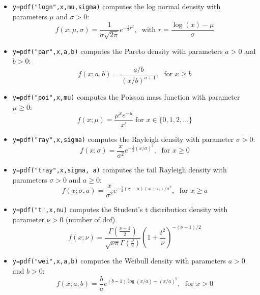 \begin{mandescription}
\begin{itemize}
\item {} \verb!y=pdf("logn",x,mu,sigma)! computes
  the log normal density with parameters $\mu$ and $\sigma > 0$:
$$
     f(x; \mu, \sigma) = \frac{ 1 }{ \sigma \sqrt{2\pi}}
     e^{-\frac{1}{2} r^2 }, \; \mbox{ with } r = \frac{\log(x)-\mu}{\sigma}
$$


\item {} \verb!y=pdf("par",x,a,b)! computes the Pareto
  density with parameters $a > 0$ and $b > 0$:
$$
     f(x; a, b) = \frac{ a/b }{ (x/b)^{a+1} }, \; \mbox{ for } x \ge b
$$


\item {} \verb!y=pdf("poi",x,mu)! computes
  the Poisson mass function with parameter $\mu \ge 0$:
$$
     f(x; \mu) = \frac{\mu^x e^{-\mu}}{x!} \;\mbox{for } x \in \{0, 1, 2, \dots\}
$$

\item {} \verb!y=pdf("ray",x,sigma)! computes the Rayleigh
  density with parameter $\sigma > 0$:
$$
     f(x; \sigma) = \frac{x}{\sigma^2} e^{-\frac{1}{2} (x/\sigma)^2 }, \; \mbox{ for } x \ge 0
$$

\item {} \verb!y=pdf("tray",x,sigma, a)! computes
  the tail Rayleigh density with parameters $\sigma > 0$ and $a \ge 0$:
$$
     f(x; \sigma, a) = \frac{x}{\sigma^2} e^{-\frac{1}{2} (x-a)(x+a)/\sigma^2 }, \; \mbox{ for } x \ge a
$$


\item {} \verb!y=pdf("t",x,nu)! computes
  the Student's t distribution density with parameter $\nu > 0$
  (number of dof).
$$
    f(x; \nu) = \frac{\Gamma(\frac{\nu+1}{2})}{\sqrt{\nu \pi}\Gamma(\frac{\nu}{2})} \left( 1 + \frac{t^2}{\nu} \right)^{-(\nu+1)/2} 
$$


\item {} \verb!y=pdf("wei",x,a,b)! computes the Weibull
  density with parameters $a > 0$ and $b > 0$:
$$
     f(x; a, b) = \frac{b}{a} e^{ (b-1)\log(x/a) - (x/a)^b }, \; \mbox{ for } x > 0
$$

\end{itemize}

\end{mandescription}


